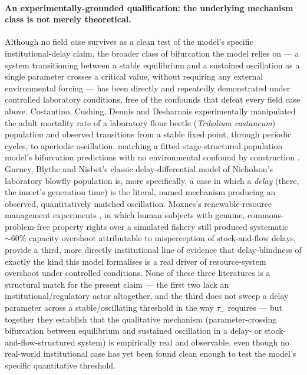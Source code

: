 \documentclass[twocolumn,10pt]{article}
\begin{document}
\paragraph{An experimentally-grounded qualification: the underlying mechanism class is not merely theoretical.} Although no field case survives as a clean test of the model's specific institutional-delay claim, the broader class of bifurcation the model relies on --- a system transitioning between a stable equilibrium and a sustained oscillation as a single parameter crosses a critical value, without requiring any external environmental forcing --- has been directly and repeatedly demonstrated under controlled laboratory conditions, free of the confounds that defeat every field case above. Costantino, Cushing, Dennis and Desharnais experimentally manipulated the adult mortality rate of a laboratory flour beetle (\emph{Tribolium castaneum}) population and observed transitions from a stable fixed point, through periodic cycles, to aperiodic oscillation, matching a fitted stage-structured population model's bifurcation predictions with no environmental confound by construction \cite{costantino1995}. Gurney, Blythe and Nisbet's classic delay-differential model of Nicholson's laboratory blowfly population \cite{gurney1980} is, more specifically, a case in which a \emph{delay} (there, the insect's generation time) is the literal, named mechanism producing an observed, quantitatively matched oscillation. Moxnes's renewable-resource management experiments \cite{moxnes1998}, in which human subjects with genuine, commons-problem-free property rights over a simulated fishery still produced systematic $\sim60\%$ capacity overshoot attributable to misperception of stock-and-flow delays, provide a third, more directly institutional line of evidence that delay-blindness of exactly the kind this model formalises is a real driver of resource-system overshoot under controlled conditions. None of these three literatures is a structural match for the present claim --- the first two lack an institutional/regulatory actor altogether, and the third does not sweep a delay parameter across a stable/oscillating threshold in the way $\tau_-$ requires --- but together they establish that the qualitative mechanism (parameter-crossing bifurcation between equilibrium and sustained oscillation in a delay- or stock-and-flow-structured system) is empirically real and observable, even though no real-world institutional case has yet been found clean enough to test the model's specific quantitative threshold.
\end{document}
